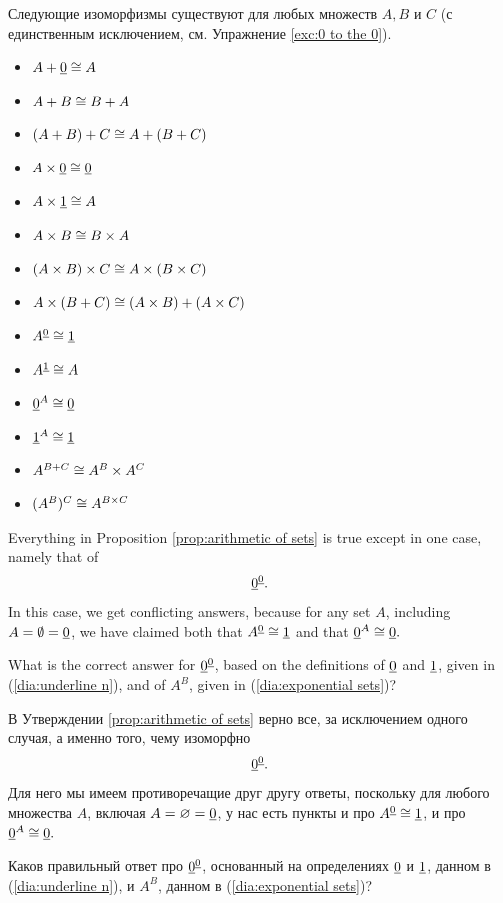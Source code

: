 \documentclass[CT4S-EN-RU]{subfiles}
\begin{document}
\begin{propositionRUS}\label{prop:arithmetic of sets}
Следующие изоморфизмы существуют для любых множеств $A,B$ и $C$ (с единственным исключением, см. Упражнение \ref{exc:0 to the 0}). 
 
\begin{itemize}
\item $A+\underline{0}\cong A$
\item $A + B\cong B + A$
\item $(A + B) + C \cong A + (B + C)$
\item $A\times\underline{0}\cong\underline{0}$
\item $A\times\underline{1}\cong A$
\item $A\times B\cong B\times A$
\item $(A\times B)\times C \cong A\times (B\times C)$
\item $A\times(B+C)\cong (A\times B)+(A\times C)$
\item $A^{\underline{0}}\cong \underline{1}$
\item $A^{\underline{1}}\cong A$
\item $\underline{0}^A\cong\underline{0}$
\item $\underline{1}^A\cong\underline{1}$
\item $A^{B+C}\cong A^B\times A^C$
\item $(A^B)^C\cong A^{B\times C}$
\end{itemize}
\end{propositionRUS}

\begin{exerciseENG}\label{exc:0 to the 0}
Everything in Proposition \ref{prop:arithmetic of sets} is true except in one case, namely that of $$\underline{0}^{\underline{0}}.$$ In this case, we get conflicting answers, because for any set $A$, including $A=\emptyset=\underline{0}$, we have claimed both that $A^{\underline{0}}\cong\underline{1}$ and that $\underline{0}^A\cong\underline{0}.$ 

What is the correct answer for $\underline{0}^{\underline{0}}$, based on the definitions of $\underline{0}$ and $\underline{1}$, given in (\ref{dia:underline n}), and of $A^B$, given in (\ref{dia:exponential sets})?
\end{exerciseENG}

\begin{exerciseRUS}\label{exc:0 to the 0}
В Утверждении \ref{prop:arithmetic of sets} верно все, за исключением одного случая, а именно того, чему изоморфно $$\underline{0}^{\underline{0}}.$$ Для него мы имеем противоречащие друг другу ответы, поскольку для любого множества $A$, включая $A=\varnothing=\underline{0}$, у нас есть пункты и про $A^{\underline{0}}\cong\underline{1}$, и про $\underline{0}^A\cong\underline{0}.$ 

Каков правильный ответ про $\underline{0}^{\underline{0}}$, основанный на определениях $\underline{0}$ и $\underline{1}$, данном в (\ref{dia:underline n}), и $A^B$, данном в (\ref{dia:exponential sets})?
\end{exerciseRUS}
\end{document}
